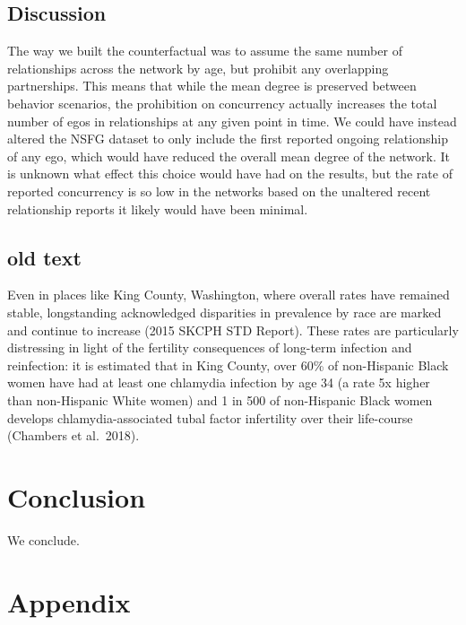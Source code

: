 \documentclass [11pt, proquest] {uwthesis}[2015/03/03]
\begin{document}
\hypertarget{discussion}{%
\section{Discussion}\label{discussion}}

The way we built the counterfactual was to assume the same number of relationships across the network by age, but prohibit any overlapping partnerships. This means that while the mean degree is preserved between behavior scenarios, the prohibition on concurrency actually increases the total number of egos in relationships at any given point in time. We could have instead altered the NSFG dataset to only include the first reported ongoing relationship of any ego, which would have reduced the overall mean degree of the network. It is unknown what effect this choice would have had on the results, but the rate of reported concurrency is so low in the networks based on the unaltered recent relationship reports it likely would have been minimal.

\hypertarget{old-text}{%
\section{old text}\label{old-text}}

Even in places like King County, Washington, where overall rates have remained stable, longstanding acknowledged disparities in prevalence by race are marked and continue to increase (2015 SKCPH STD Report). These rates are particularly distressing in light of the fertility consequences of long-term infection and reinfection: it is estimated that in King County, over 60\% of non-Hispanic Black women have had at least one chlamydia infection by age 34 (a rate 5x higher than non-Hispanic White women) and 1 in 500 of non-Hispanic Black women develops chlamydia-associated tubal factor infertility over their life-course (Chambers et al.~2018).

\hypertarget{conclusion}{%
\chapter*{Conclusion}\label{conclusion}}

We conclude.

\appendix

\hypertarget{appendix}{%
\chapter{Appendix}\label{appendix}}
\end{document}
